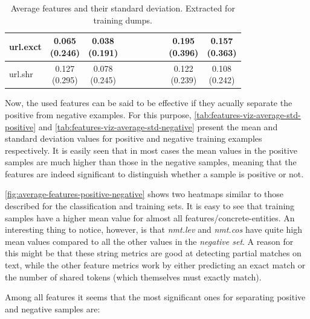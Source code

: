 \documentclass[epsfig,a4paper,11pt,titlepage,twoside,openany]{book}
\begin{document}
\begin{table}[H]
\begin{tabular}{l|c|c|c|c|c|c|c|c|c|}
\multicolumn{1}{|l|}{url.exct}                           & \makecell{0.065 \\ (0.246)}  & \makecell{0.038 \\ (0.191)} &              &              &              &              &              & \makecell{0.195 \\ (0.396)}    & \makecell{0.157 \\ (0.363)}   \\ \hline
\multicolumn{1}{|l|}{url.shr}                  & \makecell{0.127 \\ (0.295)}  & \makecell{0.078 \\ (0.245)} &              &              &              &              &              & \makecell{0.122 \\ (0.239)}    & \makecell{0.108 \\ (0.242)}   \\ \hline
\end{tabular}
\caption{Average features and their standard deviation. Extracted for training dumps.}
\label{tab:features-viz-average-std-training}
\end{table}


Now, the used features can be said to be effective if they acually separate the positive from negative examples. For this purpose, \autoref{tab:features-viz-average-std-positive} and \autoref{tab:features-viz-average-std-negative} present the mean and standard deviation values for positive and negative training examples respectively. It is easily seen that in most cases the mean values in the positive samples are much higher than those in the negative samples, meaning that the features are indeed significant to distinguish whether a sample is positive or not.
 
\autoref{fig:average-features-positive-negative} shows two heatmaps similar to those described for the classification and training sets. It is easy to see that training samples have a higher mean value for almost all features/concrete-entities. An interesting thing to notice, however, is that \textit{nmt.lev} and \textit{nmt.cos} have quite high mean values compared to all the other values in the \textit{negative set}. A reason for this might be that these string metrics are good at detecting partial matches on text, while the other feature metrics work by either predicting an exact match or the number of shared tokens (which themselves must exactly match).

Among all features it seems that the most significant ones for separating positive and negative samples are: 
\end{document}
